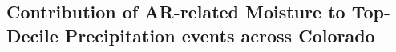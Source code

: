 \documentclass[draft]{agujournal2019}
\begin{document}
\subsection{Contribution of AR-related Moisture to Top-Decile Precipitation events across Colorado}
\label{sec:results:contribution}
\end{document}
